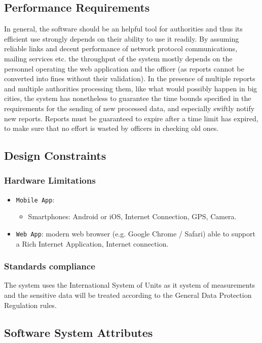 \documentclass[12pt,a4paper]{article}
\begin{document}
\subsection{Performance Requirements}
In general, the software should be an helpful tool for authorities and thus its efficient use strongly depends on their ability to use it readily. By assuming reliable links and decent performance of network protocol communications, mailing services etc. the throughput of the system mostly depends on the personnel operating the web application and the officer (as reports cannot be converted into fines without their validation). In the presence of multiple reports and multiple authorities processing them, like what would possibly happen in big cities, the system has nonetheless to guarantee the time bounds specified in the requirements for the sending of new processed data, and especially swiftly notify new reports. Reports must be guaranteed to expire after a time limit has expired, to make sure that no effort is wasted by officers in checking old ones. 
\subsection{Design Constraints}
\subsubsection{Hardware Limitations}
		\begin{itemize}
			\item \texttt{Mobile App}: 
				\begin{itemize}
					\item Smartphones: Android or iOS, Internet Connection, GPS, Camera.
				\end{itemize}
			\item \texttt{Web App}: modern web browser (e.g. Google Chrome / Safari) able to support a Rich Internet Application, Internet connection.
		\end{itemize}
\subsubsection{Standards compliance}
The system uses the International System of Units as it system of measurements and the sensitive data will be treated according to the General Data Protection Regulation rules.
\subsection{Software System Attributes} 
\end{document}

